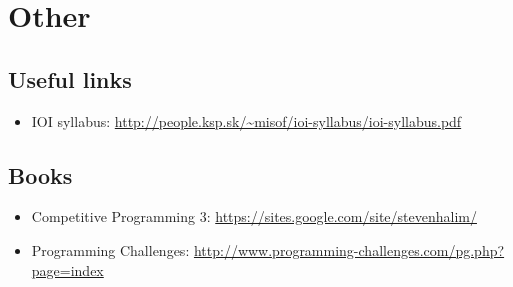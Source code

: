  
\section{Other}
\subsection{Useful links}
\begin{itemize}
 \item IOI syllabus: \url{http://people.ksp.sk/~misof/ioi-syllabus/ioi-syllabus.pdf}
\end{itemize}
\subsection{Books}
\begin{itemize}
 \item Competitive Programming 3: \url{https://sites.google.com/site/stevenhalim/}
 \item Programming Challenges: \url{http://www.programming-challenges.com/pg.php?page=index}
\end{itemize}


